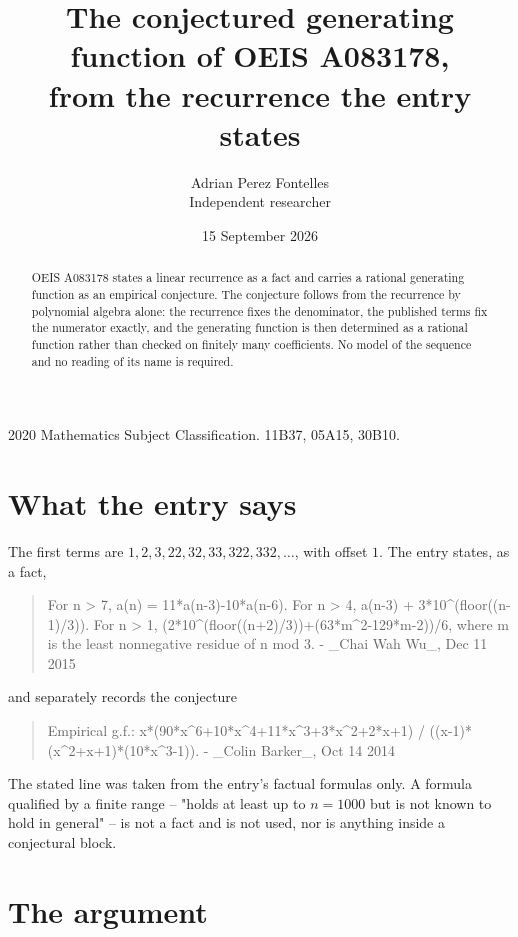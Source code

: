 \documentclass[11pt,a4paper]{article}
\title{The conjectured generating function of OEIS A083178,\\ \large from the recurrence the entry
states}
\author{Adrian Perez Fontelles\\ \small Independent researcher}
\date{15 September 2026}
\theoremstyle{plain}
\theoremstyle{definition}
\begin{document}
\maketitle

\begin{abstract}
OEIS A083178 states a linear recurrence as a fact and carries a rational generating function as an
empirical conjecture. The conjecture follows from the recurrence by polynomial algebra alone:
the recurrence fixes the denominator, the published terms fix the numerator exactly, and the
generating function is then determined as a rational function rather than checked on finitely
many coefficients. No model of the sequence and no reading of its name is required.
\end{abstract}

\noindent\small 2020 Mathematics Subject Classification. 11B37, 05A15, 30B10.\normalsize

\section{What the entry says}

The first terms are $1, 2, 3, 22, 32, 33, 322, 332,\dots$, with offset $1$. The entry states, as a fact,

\begin{quote}\raggedright For n > 7, a(n) = 11*a(n-3)-10*a(n-6). For n > 4, a(n-3) + 3*10\^{}(floor((n-1)/3)). For n > 1, (2*10\^{}(floor((n+2)/3))+(63*m\^{}2-129*m-2))/6, where m is the least nonnegative residue of n mod 3. - \_Chai Wah Wu\_, Dec 11 2015\end{quote}

\noindent and separately records the conjecture

\begin{quote}\raggedright Empirical g.f.: x*(90*x\^{}6+10*x\^{}4+11*x\^{}3+3*x\^{}2+2*x+1) / ((x-1)*(x\^{}2+x+1)*(10*x\^{}3-1)). - \_Colin Barker\_, Oct 14 2014\end{quote}

The stated line was taken from the entry's factual formulas only. A formula qualified by a
finite range -- "holds at least up to $n=1000$ but is not known to hold in general" -- is not a
fact and is not used, nor is anything inside a conjectural block.

\section{The argument}
\end{document}
